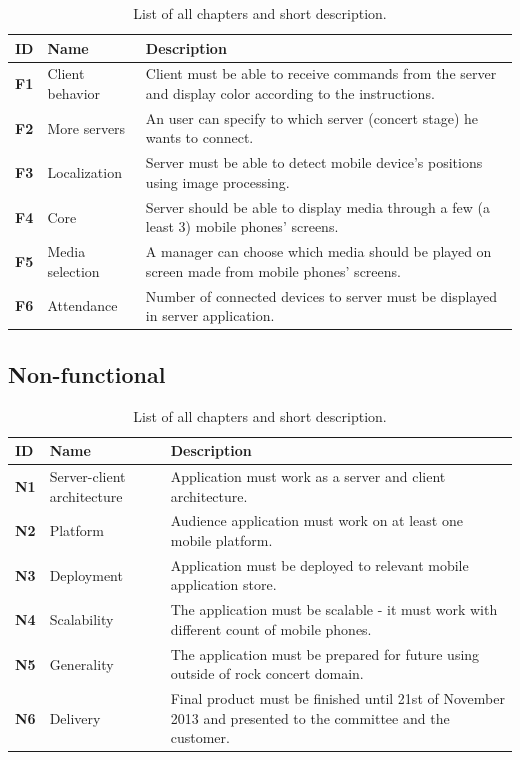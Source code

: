 \begin{table}[!h]\centering
\caption{List of all chapters and short description. }
\label{tab:req_func}
\def\arraystretch{1.3}
\begin{tabularx}{\textwidth}{llX}
\toprule[1mm]
\textbf{ID} & Name & Description\\
\midrule
{}\label{req_F1}\textbf{F1} & Client behavior & Client must be able to receive commands from the server and display color according to the instructions.\\
\textbf{F2} & More servers & An user can specify to which server (concert stage) he wants to connect.\\
\textbf{F3} & Localization & Server must be able to detect mobile device's positions using image processing.\\
\textbf{F4} & Core & Server should be able to display media through a few (a least 3) mobile phones' screens.\\
\textbf{F5} & Media selection & A manager can choose which media should be played on screen made from mobile phones' screens.\\
\textbf{F6} & Attendance & Number of connected devices to server must be displayed in server application. \\

\bottomrule[1mm]

\end{tabularx}
\end{table}

\subsection{Non-functional}

\begin{table}[!h]\centering
\caption{List of all chapters and short description. }
\label{tab:req_nonfunc}
\def\arraystretch{1.3}
\begin{tabularx}{\textwidth}{llX}
\toprule[1mm]
\textbf{ID} & Name & Description\\
\midrule
\textbf{N1} & Server-client architecture & Application must work as a server and client architecture.\\
\textbf{N2} & Platform & Audience application must work on at least one mobile platform.\\
\textbf{N3} & Deployment & Application must be deployed to relevant mobile application store.\\
\textbf{N4} & Scalability & The application must be scalable - it must work with different count of mobile phones.\\
\textbf{N5} & Generality & The application must be prepared for future using outside of rock concert domain.\\
\textbf{N6} & Delivery & Final product must be finished until 21st of November 2013 and presented to the committee and the customer.\\
\bottomrule[1mm]

\end{tabularx}
\end{table}
